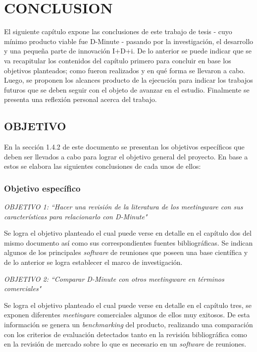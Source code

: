 \section{CONCLUSION}

El siguiente capítulo expone las conclusiones de este trabajo de tesis - cuyo mínimo producto viable fue D-Minute - pasando por la investigación, el desarrollo y una pequeña parte de innovación I+D+i. De lo anterior se puede indicar que se va recapitular los contenidos del capítulo primero para concluir en base los objetivos planteados; como fueron realizados y en qué forma se llevaron a cabo. Luego, se proponen los alcances producto de la ejecución para indicar los trabajos futuros que se deben seguir con el objeto de avanzar en el estudio. Finalmente se presenta una reflexión personal acerca del trabajo.


\subsection{OBJETIVO}

En la sección 1.4.2 de este documento se presentan los objetivos específicos que deben ser llevados a cabo para lograr el objetivo general del proyecto. En base a estos se elabora las siguientes conclusiones de cada unos de ellos:

\subsubsection{Objetivo específico}

\textit{OBJETIVO 1:  “Hacer una revisión de la literatura de los \textit{meetingware} con sus características para relacionarlo con D-Minute"}\newline

Se logra el objetivo planteado el cual puede verse en detalle en el capítulo dos del mismo documento así como sus correspondientes fuentes bibliográficas. Se indican algunos de los principales \textit{software} de reuniones que poseen una base científica y de lo anterior se logra establecer el marco de investigación.\newline

\textit{OBJETIVO 2:  “Comparar D-Minute con otros \textit{meetingware} en términos comerciales"}\newline

Se logra el objetivo planteado el cual puede verse en detalle en el capítulo tres, se exponen diferentes \textit{meetingare} comerciales algunos de ellos muy exitosos. De esta información se genera un \textit{benchmarking} del producto, realizando una comparación con los criterios de evaluación detectados tanto en la revisión bibliográfica como en la revisión de mercado sobre lo que es necesario en un \textit{software} de reuniones.\newline

